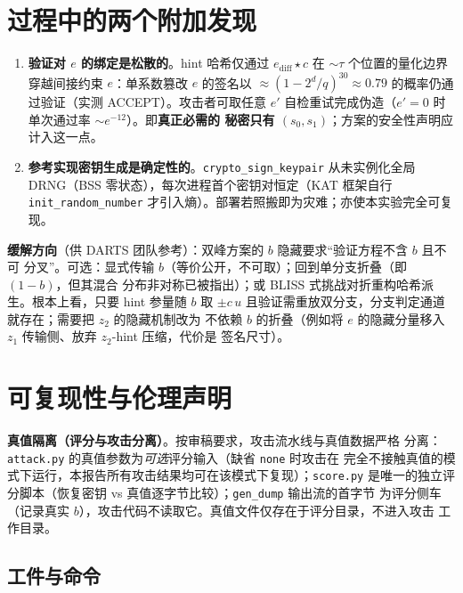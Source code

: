 \documentclass[UTF8,11pt,a4paper]{ctexart}
\newcommand{\code}[1]{\texttt{\small #1}}
\begin{document}
\section{过程中的两个附加发现}

\begin{enumerate}
\item \textbf{验证对 $e$ 的绑定是松散的}。hint 哈希仅通过 $e_{\mathrm{diff}}\star c$ 在
      $\sim\tau$ 个位置的量化边界穿越间接约束 $e$：单系数篡改 $e$ 的签名以
      $\approx(1-2^d/q)^{30}\approx0.79$ 的概率仍通过验证（实测 ACCEPT）。攻击者可取任意
      $e'$ 自检重试完成伪造（$e'{=}0$ 时单次通过率 $\sim e^{-12}$）。即\textbf{真正必需的
      秘密只有 $(s_0,s_1)$}；方案的安全性声明应计入这一点。
\item \textbf{参考实现密钥生成是确定性的}。\code{crypto\_sign\_keypair} 从未实例化全局
      DRNG（BSS 零状态），每次进程首个密钥对恒定（KAT 框架自行 \code{init\_random\_number}
      才引入熵）。部署若照搬即为灾难；亦使本实验完全可复现。
\end{enumerate}

\textbf{缓解方向}（供 DARTS 团队参考）：双峰方案的 $b$ 隐藏要求``验证方程不含 $b$ 且不可
分叉''。可选：显式传输 $b$（等价公开，不可取）；回到单分支折叠（即 $(1{-}b)$，但其混合
分布非对称已被指出）；或 BLISS 式挑战对折重构哈希派生。根本上看，只要 hint 参量随 $b$
取 $\pm c\,u$ 且验证需重放双分支，分支判定通道就存在；需要把 $z_2$ 的隐藏机制改为
不依赖 $b$ 的折叠（例如将 $e$ 的隐藏分量移入 $z_1$ 传输侧、放弃 $z_2$-hint 压缩，代价是
签名尺寸）。

\section{可复现性与伦理声明}

\noindent\textbf{真值隔离（评分与攻击分离）}。按审稿要求，攻击流水线与真值数据严格
分离：\code{attack.py} 的真值参数为\emph{可选}评分输入（缺省 \code{none} 时攻击在
完全不接触真值的模式下运行，本报告所有攻击结果均可在该模式下复现）；\code{score.py}
是唯一的独立评分脚本（恢复密钥 vs 真值逐字节比较）；\code{gen\_dump} 输出流的首字节
为评分侧车（记录真实 $b$），攻击代码不读取它。真值文件仅存在于评分目录，不进入攻击
工作目录。

\subsection{工件与命令}
\end{document}
